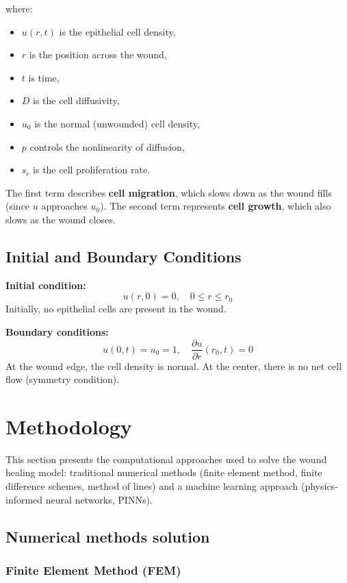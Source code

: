 \documentclass[conference]{IEEEtran}
\begin{document}
where:
\begin{itemize}
  \item $u(r,t)$ is the epithelial cell density,
  \item $r$ is the position across the wound,
  \item $t$ is time,
  \item $D$ is the cell diffusivity,
  \item $u_0$ is the normal (unwounded) cell density,
  \item $p$ controls the nonlinearity of diffusion,
  \item $s_c$ is the cell proliferation rate.
\end{itemize}

The first term describes \textbf{cell migration}, which slows down as the wound fills (since $u$ approaches $u_0$). The second term represents \textbf{cell growth}, which also slows as the wound closes.

\subsection{Initial and Boundary Conditions}

\noindent\textbf{Initial condition:}
\[
u(r, 0) = 0, \quad 0 \leq r \leq r_0
\]
Initially, no epithelial cells are present in the wound.

\medskip

\noindent\textbf{Boundary conditions:}
\[
u(0, t) = u_0 = 1, \quad \frac{\partial u}{\partial r} (r_0, t) = 0
\]
At the wound edge, the cell density is normal. At the center, there is no net cell flow (symmetry condition).

\section{Methodology}

This section presents the computational approaches used to solve the wound healing model: traditional numerical methods (finite element method, finite difference schemes, method of lines) and a machine learning approach (physics-informed neural networks, PINNs).
\subsection{\textbf{Numerical methods solution}}
\subsubsection{\textbf{Finite Element Method (FEM)}}
\end{document}
